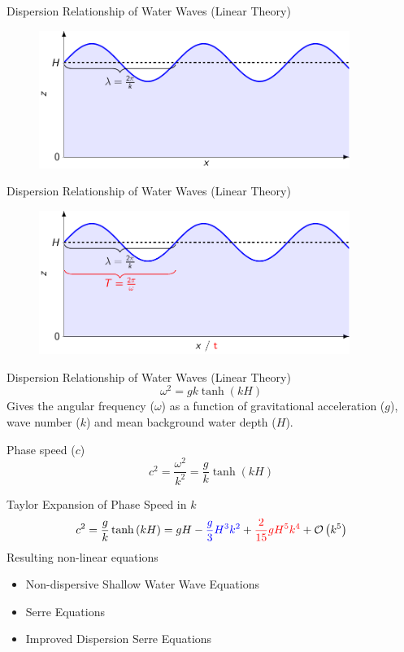 \documentclass[pdf]{beamer}
\begin{document}
\begin{frame}{Dispersion Relationship of Water Waves (Linear Theory)}
\begin{figure}
	\centering
	\includegraphics[width=0.9\textwidth]{./Pics/Tex/Explanatory/DispersionPlot/Dispersion.pdf}
\end{figure}
\end{frame}

\begin{frame}{Dispersion Relationship of Water Waves (Linear Theory)}
\begin{figure}
	\centering
	\includegraphics[width=0.9\textwidth]{./Pics/Tex/Explanatory/DispersionPlot/Dispersion_Analagous.pdf}
\end{figure}
\end{frame}

\begin{frame}{Dispersion Relationship of Water Waves (Linear Theory)}
\[\omega^2 = g k \tanh\left(kH\right) \]
Gives the angular frequency ($\omega$) as a function of gravitational acceleration ($g$), wave number ($k$) and mean background water depth ($H$). 

\bigskip
Phase speed ($c$)
\[c^2 = \frac{\omega^2}{k^2} = \frac{g}{k} \tanh\left(kH\right) \]
\end{frame}

\begin{frame}{Taylor Expansion of Phase Speed in $k$}
\[c^2  = \frac{g}{k} \tanh\left(kH\right) = gH - {\color{blue}\frac{g}{3} H^3 k^2} + {\color{red}\frac{2}{15} g H^5 k^4} + \mathcal{O}\left(k^5\right) \]
\pause
Resulting non-linear equations
\begin{itemize}
	\item Non-dispersive Shallow Water Wave Equations
	\item \color{blue} Serre Equations
	\item \color{red} Improved Dispersion Serre Equations
\end{itemize}
\end{frame}
\end{document}
